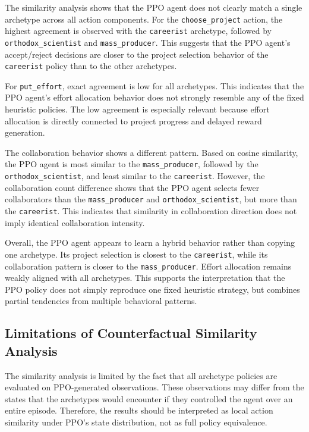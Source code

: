 \documentclass[english,bachelor]{hsluthesis}
\begin{document}
The similarity analysis shows that the PPO agent does not clearly match a single archetype across all action components. For the \texttt{choose\_project} action, the highest agreement is observed with the \texttt{careerist} archetype, followed by \texttt{orthodox\_scientist} and \texttt{mass\_producer}. This suggests that the PPO agent's accept/reject decisions are closer to the project selection behavior of the \texttt{careerist} policy than to the other archetypes.

For \texttt{put\_effort}, exact agreement is low for all archetypes. This indicates that the PPO agent's effort allocation behavior does not strongly resemble any of the fixed heuristic policies. The low agreement is especially relevant because effort allocation is directly connected to project progress and delayed reward generation.

The collaboration behavior shows a different pattern. Based on cosine similarity, the PPO agent is most similar to the \texttt{mass\_producer}, followed by the \texttt{orthodox\_scientist}, and least similar to the \texttt{careerist}. However, the collaboration count difference shows that the PPO agent selects fewer collaborators than the \texttt{mass\_producer} and \texttt{orthodox\_scientist}, but more than the \texttt{careerist}. This indicates that similarity in collaboration direction does not imply identical collaboration intensity.

Overall, the PPO agent appears to learn a hybrid behavior rather than copying one archetype. Its project selection is closest to the \texttt{careerist}, while its collaboration pattern is closer to the \texttt{mass\_producer}. Effort allocation remains weakly aligned with all archetypes. This supports the interpretation that the PPO policy does not simply reproduce one fixed heuristic strategy, but combines partial tendencies from multiple behavioral patterns.

\subsection{Limitations of Counterfactual Similarity Analysis}

The similarity analysis is limited by the fact that all archetype policies are evaluated on PPO-generated observations. These observations may differ from the states that the archetypes would encounter if they controlled the agent over an entire episode. Therefore, the results should be interpreted as local action similarity under PPO's state distribution, not as full policy equivalence.
\end{document}
